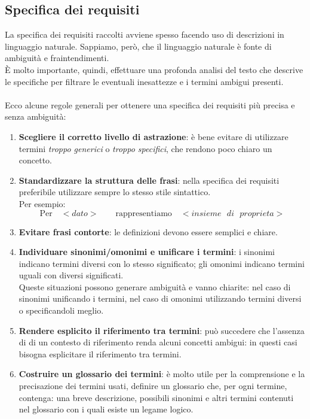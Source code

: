 \subsection{Specifica dei requisiti}
La specifica dei requisiti raccolti avviene spesso facendo uso di descrizioni in linguaggio naturale. Sappiamo, però, che il linguaggio naturale è fonte di ambiguità e fraintendimenti.\\
È molto importante, quindi, effettuare una profonda analisi del testo che descrive le specifiche per filtrare le eventuali inesattezze e i termini ambigui presenti.\\\\
Ecco alcune regole generali per ottenere una specifica dei requisiti più precisa e senza ambiguità:
    \begin{enumerate}
        \item{\textbf{Scegliere il corretto livello di astrazione}: è bene evitare di utilizzare termini \textit{troppo generici} o \textit{troppo specifici}, che rendono poco chiaro un concetto.}
        \item{\textbf{Standardizzare la struttura delle frasi}: nella specifica dei requisiti preferibile utilizzare sempre lo stesso stile sintattico.\\
        Per esempio:
            \begin{equation}
                \text{Per} \quad <dato> \qquad
                \text{rappresentiamo} \quad <insieme \text{ } di \text{ } proprieta>
            \end{equation}}
        \item{\textbf{Evitare frasi contorte}: le definizioni devono essere semplici e chiare.}
        \item{\textbf{Individuare sinonimi/omonimi e unificare i termini}: i sinonimi indicano termini diversi con lo stesso significato; gli omonimi indicano termini uguali con diversi significati.\\
        Queste situazioni possono generare ambiguità e vanno chiarite: nel caso di sinonimi unificando i termini, nel caso di omonimi utilizzando termini diversi o specificandoli meglio.}
        \item{\textbf{Rendere esplicito il riferimento tra termini}: può succedere che l'assenza di di un contesto di riferimento renda alcuni concetti ambigui: in questi casi bisogna esplicitare il riferimento tra termini.}
        \item{\textbf{Costruire un glossario dei termini}: è molto utile per la comprensione e la precisazione dei termini usati, definire un glossario che, per ogni termine, contenga: una breve descrizione, possibili sinonimi e altri termini contenuti nel glossario con i quali esiste un legame logico.}
    \end{enumerate}


